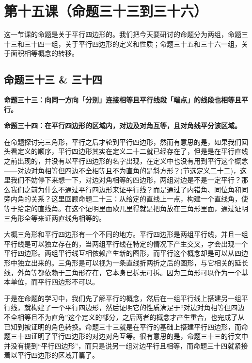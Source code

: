 \documentclass[
]{book}
\begin{document}
\hypertarget{ux7b2cux5341ux4e94ux8bfeux547dux9898ux4e09ux5341ux4e09ux5230ux4e09ux5341ux516d}{%
\chapter{第十五课（命题三十三到三十六）}\label{ux7b2cux5341ux4e94ux8bfeux547dux9898ux4e09ux5341ux4e09ux5230ux4e09ux5341ux516d}}

这一节课的命题是关于平行四边形的。我们把今天要研讨的命题分为两组，命题三十三和三十四一组，关于平行四边形的定义和性质；命题三十五和三十六一组，关于面积相等概念的转移。

\hypertarget{ux547dux9898ux4e09ux5341ux4e09-ux4e09ux5341ux56db}{%
\section{命题三十三 \& 三十四}\label{ux547dux9898ux4e09ux5341ux4e09-ux4e09ux5341ux56db}}

\textbf{命题三十三：向同一方向「分别」连接相等且平行线段「端点」的线段也相等且平行。}

\textbf{命题三十四：在平行四边形的区域内，对边及对角互等，且对角线平分该区域。}

在命题探讨完三角形，平行之后才轮到平行四边形，然而有意思的是，如果我们回头看定义的顺序，平行四边形其实在定义二十二就已经存在了，但是是在平行直线之前出现的，并没有以平行四边形的名字出现，在定义中也没有用到平行这个概念------对边对角相等但四边不全相等且不为直角的是斜方形？(节选定义二十二)，这里我们不妨停下来想一下，对边对角相等的四边形，两组对边是不是一定平行？那么我们之前为什么不通过平行四边形来证平行线？而是通过了内错角、同位角和同旁内角的关系？这里回顾命题二十三：从给定的直线上一点，构建一个直线角，使等于给定的直线角。在这个证明里面欧几里得就是把角放在三角形里面，通过证明三角形全等来证两直线角相等的。

大概三角形和平行四边形有一个不同的地方。平行四边形是两组平行线，并且一组平行线是可以独立存在的，当两组平行线在特定的情况下产生交叉，才会出现一个平行四边形。两组平行线互相依赖产生新的图形，而平行这个概念却是可以从四边形中独立出来的。三角形是可以视为一条直线折两折之后的图形，与它相关的延长线，外角等都依赖于三角形存在，它本身已拆无可拆。因为三角形可以作为一个基本单位，而平行四边形不可以。

于是在命题的学习中，我们先了解平行的概念，然后在一组平行线上搭建另一组平行线，就构建了一个平行四边形，然后证明它的性质满足于``对边对角相等但四边不全相等且不为直角''这个定义的部分，之后两者的概念才产生重合，也完成了从已知到被证明的角色转换。命题三十三就是在平行的基础上搭建平行四边形，而命题三十四证明了平行四边形的对边对角互等。很有意思的是，命题三十三的行文中并没有提到``平行四边形''，而只是说另一组对边平行且相等，而命题三十四就紧接着以平行四边形的区域开篇了。
\end{document}
